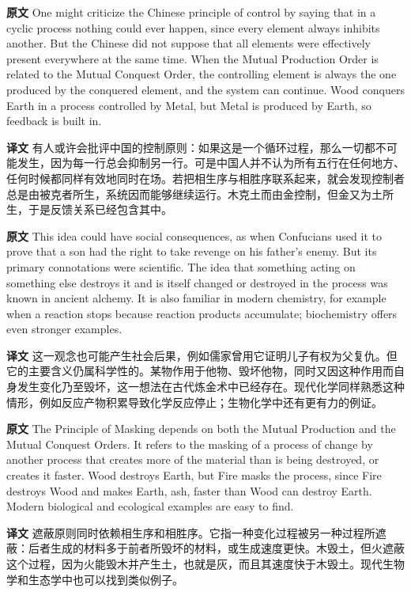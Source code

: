 \documentclass[UTF8,zihao=-4]{ctexart}
\newcommand{\BodyFont}{\fontsize{10.5pt}{15.5pt}\selectfont}
\newcommand{\origlabel}{\textbf{原文}\quad}
\newcommand{\translabel}{\textbf{译文}\quad}
\newenvironment{enblock}{\par\noindent\begingroup\BodyFont\origlabel}{\par\endgroup}
\newenvironment{zhblock}{\par\noindent\begingroup\BodyFont\translabel}{\par\endgroup\vspace{0.35em}}
\begin{document}
\begin{enblock}
One might criticize the Chinese principle of control by saying that in a cyclic process nothing could ever happen, since every element always inhibits another. But the Chinese did not suppose that all elements were effectively present everywhere at the same time. When the Mutual Production Order is related to the Mutual Conquest Order, the controlling element is always the one produced by the conquered element, and the system can continue. Wood conquers Earth in a process controlled by Metal, but Metal is produced by Earth, so feedback is built in.
\end{enblock}
\begin{zhblock}
有人或许会批评中国的控制原则：如果这是一个循环过程，那么一切都不可能发生，因为每一行总会抑制另一行。可是中国人并不认为所有五行在任何地方、任何时候都同样有效地同时在场。若把相生序与相胜序联系起来，就会发现控制者总是由被克者所生，系统因而能够继续运行。木克土而由金控制，但金又为土所生，于是反馈关系已经包含其中。
\end{zhblock}

\begin{enblock}
This idea could have social consequences, as when Confucians used it to prove that a son had the right to take revenge on his father's enemy. But its primary connotations were scientific. The idea that something acting on something else destroys it and is itself changed or destroyed in the process was known in ancient alchemy. It is also familiar in modern chemistry, for example when a reaction stops because reaction products accumulate; biochemistry offers even stronger examples.
\end{enblock}
\begin{zhblock}
这一观念也可能产生社会后果，例如儒家曾用它证明儿子有权为父复仇。但它的主要含义仍属科学性的。某物作用于他物、毁坏他物，同时又因这种作用而自身发生变化乃至毁坏，这一想法在古代炼金术中已经存在。现代化学同样熟悉这种情形，例如反应产物积累导致化学反应停止；生物化学中还有更有力的例证。
\end{zhblock}

\begin{enblock}
The Principle of Masking depends on both the Mutual Production and the Mutual Conquest Orders. It refers to the masking of a process of change by another process that creates more of the material than is being destroyed, or creates it faster. Wood destroys Earth, but Fire masks the process, since Fire destroys Wood and makes Earth, ash, faster than Wood can destroy Earth. Modern biological and ecological examples are easy to find.
\end{enblock}
\begin{zhblock}
遮蔽原则同时依赖相生序和相胜序。它指一种变化过程被另一种过程所遮蔽：后者生成的材料多于前者所毁坏的材料，或生成速度更快。木毁土，但火遮蔽这个过程，因为火能毁木并产生土，也就是灰，而且其速度快于木毁土。现代生物学和生态学中也可以找到类似例子。
\end{zhblock}
\end{document}
